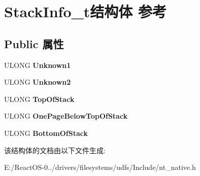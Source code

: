 \hypertarget{struct_stack_info__t}{}\section{Stack\+Info\+\_\+t结构体 参考}
\label{struct_stack_info__t}
\subsection*{Public 属性}
\begin{DoxyCompactItemize}
\item 
\mbox{\label{struct_stack_info__t_af8bc58dfdb80a7b08d35c9e57986a8b0}} 
U\+L\+O\+NG {\bfseries Unknown1}
\item 
\mbox{\label{struct_stack_info__t_af2163d4a3a694d2e60dc6ff9088af123}} 
U\+L\+O\+NG {\bfseries Unknown2}
\item 
\mbox{\label{struct_stack_info__t_a503500c348c3a55eb95255ddfc313ae3}} 
U\+L\+O\+NG {\bfseries Top\+Of\+Stack}
\item 
\mbox{\label{struct_stack_info__t_a969b405c570871c0f69bd2f7e73b5ff7}} 
U\+L\+O\+NG {\bfseries One\+Page\+Below\+Top\+Of\+Stack}
\item 
\mbox{\label{struct_stack_info__t_a3c0154be452d8e75b9d1a0a423d850cd}} 
U\+L\+O\+NG {\bfseries Bottom\+Of\+Stack}
\end{DoxyCompactItemize}


该结构体的文档由以下文件生成\+:\begin{DoxyCompactItemize}
\item 
E\+:/\+React\+O\+S-\/0../drivers/filesystems/udfs/\+Include/nt\+\_\+native.\+h\end{DoxyCompactItemize}
